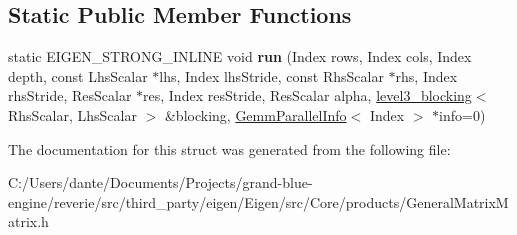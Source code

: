 \subsection*{Static Public Member Functions}
\begin{DoxyCompactItemize}
\item 
\mbox{\label{struct_eigen_1_1internal_1_1general__matrix__matrix__product_3_01_index_00_01_lhs_scalar_00_01_l7e45e4188e95a69de1c658ab4a83c882_a4c8f6981f0d7deb0d3c2e24bf5340196}} 
static E\+I\+G\+E\+N\+\_\+\+S\+T\+R\+O\+N\+G\+\_\+\+I\+N\+L\+I\+NE void {\bfseries run} (Index rows, Index cols, Index depth, const Lhs\+Scalar $\ast$lhs, Index lhs\+Stride, const Rhs\+Scalar $\ast$rhs, Index rhs\+Stride, Res\+Scalar $\ast$res, Index res\+Stride, Res\+Scalar alpha, \mbox{\hyperlink{class_eigen_1_1internal_1_1level3__blocking}{level3\+\_\+blocking}}$<$ Rhs\+Scalar, Lhs\+Scalar $>$ \&blocking, \mbox{\hyperlink{struct_eigen_1_1internal_1_1_gemm_parallel_info}{Gemm\+Parallel\+Info}}$<$ Index $>$ $\ast$info=0)
\end{DoxyCompactItemize}


The documentation for this struct was generated from the following file\+:\begin{DoxyCompactItemize}
\item 
C\+:/\+Users/dante/\+Documents/\+Projects/grand-\/blue-\/engine/reverie/src/third\+\_\+party/eigen/\+Eigen/src/\+Core/products/General\+Matrix\+Matrix.\+h\end{DoxyCompactItemize}
